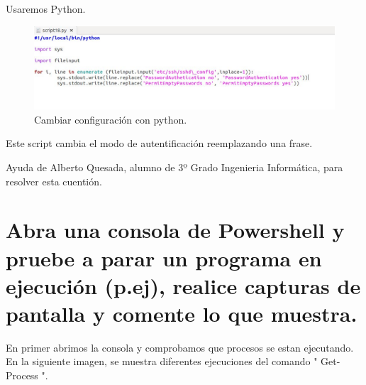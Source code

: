 Usaremos Python.

\begin{figure}[H]
\begin{center}
\includegraphics[scale=0.4]{Imagenes/scriptpy.eps}
\caption{Cambiar configuración con python.}
\end{center}
\end{figure}

Este script cambia el modo de autentificación reemplazando una frase.


Ayuda de Alberto Quesada, alumno de 3º Grado Ingenieria Informática, para resolver esta cuentión.

\section{Abra una consola de Powershell y pruebe a parar un programa en ejecución (p.ej), realice capturas de pantalla y comente lo que muestra.}

En primer abrimos la consola y comprobamos que procesos se estan ejecutando. En la siguiente imagen, se muestra diferentes ejecuciones del comando " Get-Process ".

